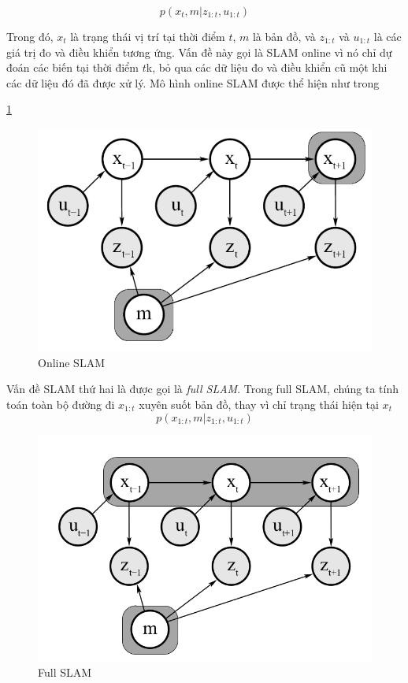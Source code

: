 {{\begin{equation}
  p\left({x}_{t}, m | {z}_{1:t}, {u}_{1:t}\right)
\end{equation}

Trong đó, ${x}_{t}$ là trạng thái vị trí tại thời điểm $t$, $m$ là bản đồ, và ${z}_{1:t}$ và ${u}_{1:t}$ là các giá trị đo và điều khiển tương ứng. Vấn đề này gọi là SLAM online vì nó chỉ dự đoán các biến tại thời điểm $t$k, bỏ qua các dữ liệu đo và điều khiển cũ một khi các dữ liệu đó đã được xử lý. Mô hình online SLAM được thể hiện như trong \figurename{ \ref{fig:onlineSLAM}

\begin{figure}[htbp]
  \centering
  \includegraphics[width=0.6\linewidth]{figures/onlineSLAM.PNG}
  \caption{Online SLAM}
  \label{fig:onlineSLAM}
\end{figure}

Vấn đề SLAM thứ hai là được gọi là \textit{full SLAM}. Trong full SLAM, chúng ta tính toán toàn bộ đường đi ${x}_{1:t}$ xuyên suốt bản đồ, thay vì chỉ trạng thái hiện tại ${x}_{t}$
\begin{equation}
  p\left({x}_{1:t},m | {z}_{1:t}, {u}_{1:t}\right)
\end{equation}

\begin{figure}[htbp]
  \centering
  \includegraphics[width=0.6\linewidth]{figures/fullSLAM.png}
  \caption{Full SLAM}
  \label{fig:fullSLAM}
\end{figure}

}}}
